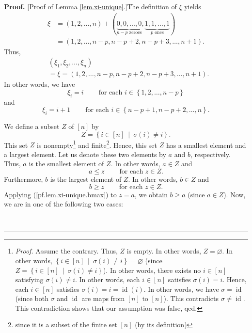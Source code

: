 \documentclass[numbers=enddot,12pt,final,onecolumn,notitlepage,english]{scrartcl}%
\theoremstyle{definition}
\newenvironment{proof}[1][Proof]{\noindent\textbf{#1.} }{\ \rule{0.5em}{0.5em}}
\newenvironment{verlong}{}{}
\begin{document}
\begin{verlong}
\begin{proof}
[Proof of Lemma \ref{lem.xi-unique}.]The definition of $\xi$ yields%
\begin{align*}
\xi &  =\left(  1,2,\ldots,n\right)  +\left(  \underbrace{0,0,\ldots
,0}_{n-p\text{ zeroes}},\underbrace{1,1,\ldots,1}_{p\text{ ones}}\right) \\
&  =\left(  1,2,\ldots,n-p,n-p+2,n-p+3,\ldots,n+1\right)  .
\end{align*}
Thus,%
\begin{align}
&  \left(  \xi_{1},\xi_{2},\ldots,\xi_{n}\right) \nonumber\\
&  =\xi=\left(  1,2,\ldots,n-p,n-p+2,n-p+3,\ldots,n+1\right)  .
\label{pf.lem.xi-unique.xi=2}%
\end{align}
In other words, we have%
\begin{equation}
\xi_{i}=i\ \ \ \ \ \ \ \ \ \ \text{for each }i\in\left\{  1,2,\ldots
,n-p\right\}  \label{pf.lem.xi-unique.xii=}%
\end{equation}
and%
\begin{equation}
\xi_{i}=i+1\ \ \ \ \ \ \ \ \ \ \text{for each }i\in\left\{  n-p+1,n-p+2,\ldots
,n\right\}  . \label{pf.lem.xi-unique.xin=}%
\end{equation}


We define a subset $Z$ of $\left[  n\right]  $ by%
\[
Z=\left\{  i\in\left[  n\right]  \ \mid\ \sigma\left(  i\right)  \neq
i\right\}  .
\]
This set $Z$ is nonempty\footnote{\textit{Proof.} Assume the contrary. Thus,
$Z$ is empty. In other words, $Z=\varnothing$. In other words, $\left\{
i\in\left[  n\right]  \ \mid\ \sigma\left(  i\right)  \neq i\right\}
=\varnothing$ (since $Z=\left\{  i\in\left[  n\right]  \ \mid\ \sigma\left(
i\right)  \neq i\right\}  $). In other words, there exists no $i\in\left[
n\right]  $ satisfying $\sigma\left(  i\right)  \neq i$. In other words, each
$i\in\left[  n\right]  $ satisfies $\sigma\left(  i\right)  =i$. Hence, each
$i\in\left[  n\right]  $ satisfies $\sigma\left(  i\right)
=i=\operatorname*{id}\left(  i\right)  $. In other words, we have
$\sigma=\operatorname*{id}$ (since both $\sigma$ and $\operatorname*{id}$ are
maps from $\left[  n\right]  $ to $\left[  n\right]  $). This contradicts
$\sigma\neq\operatorname*{id}$. This contradiction shows that our assumption
was false, qed.} and finite\footnote{since it is a subset of the finite set
$\left[  n\right]  $ (by its definition)}. Hence, this set $Z$ has a smallest
element and a largest element. Let us denote these two elements by $a$ and
$b$, respectively. Thus, $a$ is the smallest element of $Z$. In other words,
$a\in Z$ and%
\begin{equation}
a\leq z\ \ \ \ \ \ \ \ \ \ \text{for each }z\in Z.
\label{pf.lem.xi-unique.amin}%
\end{equation}
Furthermore, $b$ is the largest element of $Z$. In other words, $b\in Z$ and%
\begin{equation}
b\geq z\ \ \ \ \ \ \ \ \ \ \text{for each }z\in Z.
\label{pf.lem.xi-unique.bmax}%
\end{equation}
Applying (\ref{pf.lem.xi-unique.bmax}) to $z=a$, we obtain $b\geq a$ (since
$a\in Z$). Now, we are in one of the following two cases:


\end{proof}
\end{verlong}
\end{document}
